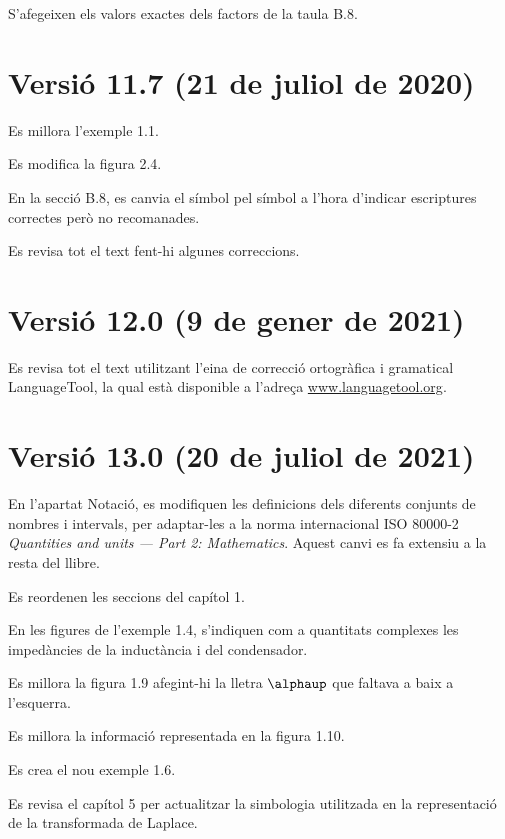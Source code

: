 S'afegeixen els valors exactes dels factors de la taula B.8.


\section*{Versió 11.7 (21 de juliol de 2020)}

Es millora l'exemple 1.1.

Es modifica la figura 2.4.

En la secció B.8, es canvia el símbol \textcolor{Blue}\faQuestionCircle{} pel símbol \textcolor{Blue}\faExclamationTriangle{} a l'hora d'indicar escriptures correctes però no recomanades.

Es revisa tot el text fent-hi algunes correccions.


\section*{Versió 12.0 (9 de gener de 2021)}

Es revisa tot el text utilitzant l'eina de correcció ortogràfica i gramatical \textsf{LanguageTool}, la qual està disponible a l'adreça \href{https://www.languagetool.org}{www.languagetool.org}.


\section*{Versió 13.0 (20 de juliol de 2021)}

En l'apartat Notació, es modifiquen les definicions dels diferents conjunts de nombres i intervals, per adaptar-les a la norma internacional ISO 80000-2 \textit{Quantities and units --- Part 2: Mathematics}. Aquest canvi es fa extensiu a la resta del llibre.

Es reordenen les seccions del capítol 1.

En les figures de l'exemple 1.4, s'indiquen com a quantitats complexes les impedàncies de la inductància i del condensador.

Es millora la figura 1.9 afegint-hi la lletra $\alphaup$ que faltava  a baix a l'esquerra.

Es millora la informació representada en la figura 1.10.

Es crea el nou exemple 1.6.

Es revisa el capítol 5 per actualitzar la simbologia utilitzada en la representació de la transformada de Laplace.

